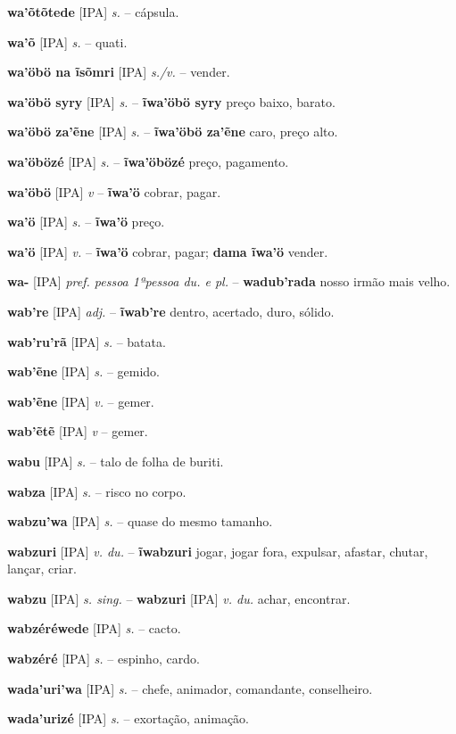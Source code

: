 \textbf{wa'õtõtede} [IPA] \textit{s.} -- cápsula.

\textbf{wa'õ} [IPA] \textit{s.} -- quati.

\textbf{wa'öbö na ĩsõmri} [IPA] \textit{s./v.} -- vender.

\textbf{wa'öbö syry} [IPA] \textit{s.} -- \textbf{ĩwa'öbö syry} preço baixo, barato.

\textbf{wa'öbö za'ẽne} [IPA] \textit{s.} -- \textbf{ĩwa'öbö za'ẽne} caro, preço alto.

\textbf{wa'öbözé} [IPA] \textit{s.} -- \textbf{ĩwa'öbözé} preço, pagamento.

\textbf{wa'öbö} [IPA] \textit{v} -- \textbf{ĩwa'ö} cobrar, pagar.

\textbf{wa'ö} [IPA] \textit{s.} -- \textbf{ĩwa'ö} preço.

\textbf{wa'ö} [IPA] \textit{v.} -- \textbf{ĩwa'ö} cobrar, pagar; \textbf{dama ĩwa'ö} vender.

\textbf{wa-} [IPA] \textit{pref. pessoa 1ªpessoa du. e pl.} -- \textbf{wadub'rada} nosso irmão mais velho.

\textbf{wab're} [IPA] \textit{adj.} -- \textbf{ĩwab're} dentro, acertado, duro, sólido.

\textbf{wab'ru'rã} [IPA] \textit{s.} -- batata.

\textbf{wab'ẽne} [IPA] \textit{s.} -- gemido.

\textbf{wab'ẽne} [IPA] \textit{v.} -- gemer.

\textbf{wab'ẽtẽ} [IPA] \textit{v} -- gemer.

\textbf{wabu} [IPA] \textit{s.} -- talo de folha de buriti.

\textbf{wabza} [IPA] \textit{s.} -- risco no corpo.

\textbf{wabzu'wa} [IPA] \textit{s.} -- quase do mesmo tamanho.

\textbf{wabzuri} [IPA] \textit{v. du.} -- \textbf{ĩwabzuri} jogar, jogar fora, expulsar, afastar, chutar, lançar, criar.

\textbf{wabzu} [IPA] \textit{s. sing.} -- \textbf{wabzuri} [IPA] \textit{v. du.} achar, encontrar.

\textbf{wabzéréwede} [IPA] \textit{s.} -- cacto.

\textbf{wabzéré} [IPA] \textit{s.} -- espinho, cardo.

\textbf{wada'uri'wa} [IPA] \textit{s.} -- chefe, animador, comandante, conselheiro.

\textbf{wada'urizé} [IPA] \textit{s.} -- exortação, animação.

